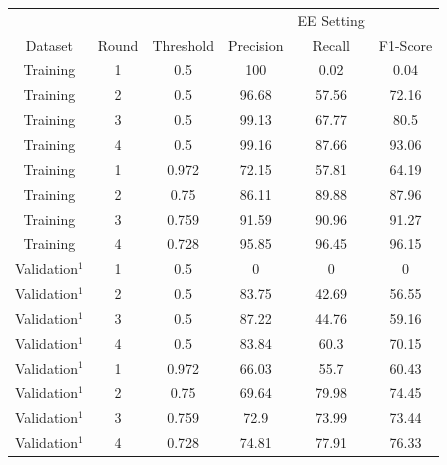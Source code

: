\documentclass{report}
\theoremstyle{definition}
\theoremstyle{remark}
\begin{document}
\begin{table}[H]
    \vspace{0.5cm}\begin{tabular}{cccccc}
    &&&&EE Setting & \\
    Dataset & Round    & Threshold & Precision & Recall & F1-Score \\
    \hline
    Training & 1 & 0.5&100&0.02&0.04 \\
    Training & 2 & 0.5&96.68&57.56&72.16 \\
    Training & 3 & 0.5&99.13&67.77&80.5 \\
    Training & 4 & 0.5&99.16&87.66&93.06 \\
    \hline
    Training & 1 & 0.972&72.15&57.81&64.19 \\
    Training & 2 & 0.75&86.11&89.88&87.96 \\
    Training & 3 & 0.759&91.59&90.96&91.27 \\
    Training & 4 & 0.728 &95.85&96.45&96.15\\
    \hline
    Validation$^1$ & 1 & 0.5&0&0&0 \\
    Validation$^1$ & 2 & 0.5&83.75&42.69&56.55 \\
    Validation$^1$ & 3 & 0.5&87.22&44.76&59.16 \\
    Validation$^1$ & 4 & 0.5&83.84&60.3&70.15 \\
    \hline
    Validation$^1$ & 1 & 0.972 &66.03&55.7&60.43\\
    Validation$^1$ & 2 & 0.75  &69.64&79.98&74.45\\
    Validation$^1$ & 3 & 0.759 &72.9&73.99&73.44\\
    Validation$^1$ & 4 & 0.728 &74.81&77.91&76.33\\
    \end{tabular}
    

\end{table}
\end{document}
